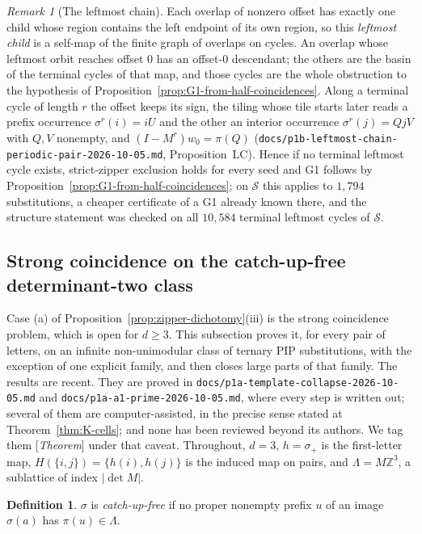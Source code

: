 \documentclass[11pt]{amsart}
\theoremstyle{plain}
\theoremstyle{definition}
\newtheorem{definition}[theorem]{Definition}
\theoremstyle{remark}
\newtheorem{remark}[theorem]{Remark}
\newcommand{\Z}{\mathbb{Z}}
\newcommand{\Status}[1]{\textup{[\textit{#1}]}}
\begin{document}
\begin{remark}[The leftmost chain]\label{rem:leftmost-chain}
Each overlap of nonzero offset has exactly one child whose region contains the left endpoint of its own region, so this \emph{leftmost child} is a self-map of the finite graph of overlaps on cycles. An overlap whose leftmost orbit reaches offset $0$ has an offset-$0$ descendant; the others are the basin of the terminal cycles of that map, and those cycles are the whole obstruction to the hypothesis of Proposition~\ref{prop:G1-from-half-coincidences}. Along a terminal cycle of length $r$ the offset keeps its sign, the tiling whose tile starts later reads a prefix occurrence $\sigma^r(i)=iU$ and the other an interior occurrence $\sigma^r(j)=QjV$ with $Q,V$ nonempty, and $(I-M^r)w_0=\pi(Q)$ (\texttt{docs/p1b-leftmost-chain-periodic-pair-2026-10-05.md}, Proposition~LC). Hence if no terminal leftmost cycle exists, strict-zipper exclusion holds for every seed and G1 follows by Proposition~\ref{prop:G1-from-half-coincidences}; on $\mathcal S$ this applies to $1{,}794$ substitutions, a cheaper certificate of a G1 already known there, and the structure statement was checked on all $10{,}584$ terminal leftmost cycles of $\mathcal S$.
\end{remark}

\subsection{Strong coincidence on the catch-up-free determinant-two class}\label{sec:catchup-free}

Case (a) of Proposition~\ref{prop:zipper-dichotomy}(iii) is the strong coincidence problem, which is open for $d\ge3$. This subsection proves it, for every pair of letters, on an infinite non-unimodular class of ternary PIP substitutions, with the exception of one explicit family, and then closes large parts of that family. The results are recent. They are proved in \texttt{docs/p1a-template-collapse-2026-10-05.md} and \texttt{docs/p1a-a1-prime-2026-10-05.md}, where every step is written out; several of them are computer-assisted, in the precise sense stated at Theorem~\ref{thm:K-cells}; and none has been reviewed beyond its authors. We tag them \Status{Theorem} under that caveat. Throughout, $d=3$, $h=\sigma_+$ is the first-letter map, $H(\{i,j\})=\{h(i),h(j)\}$ is the induced map on pairs, and $\Lambda=M\Z^3$, a sublattice of index $|\det M|$.

\begin{definition}\label{def:catchup-free}
$\sigma$ is \emph{catch-up-free} if no proper nonempty prefix $u$ of an image $\sigma(a)$ has $\pi(u)\in\Lambda$.
\end{definition}
\end{document}
